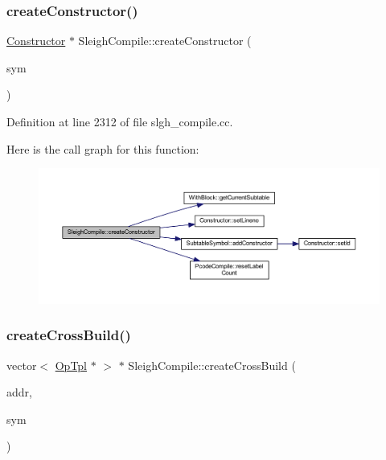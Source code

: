 \subsubsection{\texorpdfstring{createConstructor()}{createConstructor()}}
{\footnotesize\ttfamily \mbox{\hyperlink{class_constructor}{Constructor}} $\ast$ Sleigh\+Compile\+::create\+Constructor (\begin{DoxyParamCaption}\item[{\mbox{\hyperlink{class_subtable_symbol}{Subtable\+Symbol}} $\ast$}]{sym }\end{DoxyParamCaption})}



Definition at line 2312 of file slgh\+\_\+compile.\+cc.

Here is the call graph for this function\+:
\nopagebreak
\begin{figure}[H]
\begin{center}
\leavevmode
\includegraphics[width=350pt]{class_sleigh_compile_ac31ebb2619890f9c574cd2c18d198995_cgraph}
\end{center}
\end{figure}
\mbox{\label{class_sleigh_compile_ac6de6c64a443c17ee0c0b33d0dbf4458}} 
\subsubsection{\texorpdfstring{createCrossBuild()}{createCrossBuild()}}
{\footnotesize\ttfamily vector$<$ \mbox{\hyperlink{class_op_tpl}{Op\+Tpl}} $\ast$ $>$ $\ast$ Sleigh\+Compile\+::create\+Cross\+Build (\begin{DoxyParamCaption}\item[{\mbox{\hyperlink{class_varnode_tpl}{Varnode\+Tpl}} $\ast$}]{addr,  }\item[{\mbox{\hyperlink{class_section_symbol}{Section\+Symbol}} $\ast$}]{sym }\end{DoxyParamCaption})}



